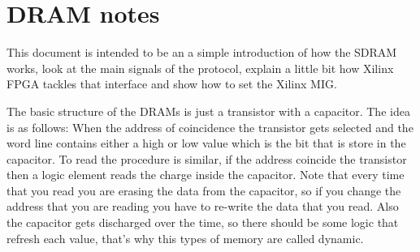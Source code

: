 %
%


\section{DRAM notes}

This document is intended to be an a simple introduction of how the SDRAM works, look at the main signals of the protocol, explain a little bit how Xilinx FPGA tackles that interface and show how to set the Xilinx MIG. 

The basic structure of the DRAMs is just a transistor with a capacitor.
The idea is as follows: When the address of coincidence the transistor gets selected and the word line contains either a high or low value which is the bit that is store in the capacitor. 
To read the procedure is similar, if the address coincide the transistor then a logic element reads the charge inside the capacitor. Note that every time that you read you are erasing the data from the capacitor, so if you change the address that you are reading you have to re-write the data that you read.
Also the capacitor gets discharged over the time, so there should be some logic that refresh each value, that's why this types of memory are called dynamic. 



